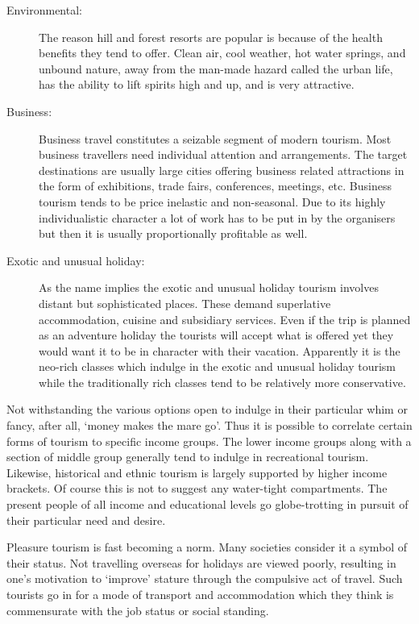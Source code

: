 \begin{description}
  \item[Environmental:] The reason hill and forest resorts are popular is because of the health benefits they tend to offer. Clean air, cool weather, hot water springs, and unbound nature, away from the man-made hazard called the urban life, has the ability to lift spirits high and up, and is very attractive.

  \item[Business:] Business travel constitutes a seizable segment of modern tourism. Most business travellers need individual attention and arrangements. The target destinations are usually large cities offering business related attractions in the form of exhibitions, trade fairs, conferences, meetings, etc. Business tourism tends to be price inelastic and non-seasonal. Due to its highly individualistic character a lot of work has to be put in by the organisers but then it is usually proportionally profitable as well.

  \item[Exotic and unusual holiday:] As the name implies the exotic and unusual holiday tourism involves distant but sophisticated places. These demand superlative accommodation, cuisine and subsidiary services. Even if the trip is planned as an adventure holiday the tourists will accept what is offered yet they would want it to be in character with their vacation. Apparently it is the neo-rich classes which indulge in the exotic and unusual holiday tourism while the traditionally rich classes tend to be relatively more conservative.

\end{description}

\noindent Not withstanding the various options open to indulge in their particular whim or fancy, after all, `money makes the mare go'. Thus it is possible to correlate certain forms of tourism to specific income groups. The lower income groups along with a section of middle group generally tend to indulge in recreational tourism. Likewise, historical and ethnic tourism is largely supported by higher income brackets. Of course this is not to suggest any water-tight compartments. The present people of all income and educational levels go globe-trotting in pursuit of their particular need and desire.

Pleasure tourism is fast becoming a norm. Many societies consider it a symbol of their status. Not travelling overseas for holidays are viewed poorly, resulting in one's motivation to `improve' stature through the compulsive act of travel. Such tourists go in for a mode of transport and accommodation which they think is commensurate with the job status or social standing.


